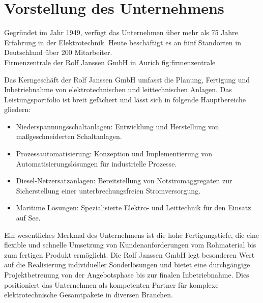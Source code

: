 
\section{Vorstellung des Unternehmens}
\label{chap:vorstellung_unternehmen}

Gegründet im Jahr 1949, verfügt das Unternehmen über mehr als 75 Jahre Erfahrung in der Elektrotechnik. Heute beschäftigt es an fünf Standorten in Deutschland über 200 Mitarbeiter.\\


{Firmenzentrale der Rolf Janssen GmbH in Aurich}
{fig:firmenzentrale}


Das Kerngeschäft der Rolf Janssen GmbH umfasst die Planung, Fertigung und Inbetriebnahme von elektrotechnischen und leittechnischen Anlagen. Das Leistungsportfolio ist breit gefächert und lässt sich in folgende Hauptbereiche gliedern:\\

\begin{itemize}
    \item Niederspannungsschaltanlagen: Entwicklung und Herstellung von maßgeschneiderten Schaltanlagen.
    \item Prozessautomatisierung: Konzeption und Implementierung von Automatisierungslösungen für industrielle Prozesse.
    \item Diesel-Netzersatzanlagen: Bereitstellung von Notstromaggregaten zur Sicherstellung einer unterbrechungsfreien Stromversorgung.
    \item Maritime Lösungen: Spezialisierte Elektro- und Leittechnik für den Einsatz auf See.\\
\end{itemize}

Ein wesentliches Merkmal des Unternehmens ist die hohe Fertigungstiefe, die eine flexible und schnelle Umsetzung von Kundenanforderungen vom Rohmaterial bis zum fertigen Produkt ermöglicht. Die Rolf Janssen GmbH legt besonderen Wert auf die Realisierung individueller Sonderlösungen und bietet eine durchgängige Projektbetreuung von der Angebotsphase bis zur finalen Inbetriebnahme. Dies positioniert das Unternehmen als kompetenten Partner für komplexe elektrotechnische Gesamtpakete in diversen Branchen.\\

